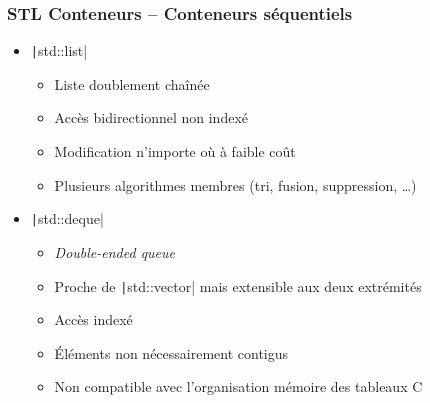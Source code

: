 \documentclass[C++.tex]{subfiles}
\begin{document}
\begin{frame}[fragile]
	\frametitle{STL Conteneurs -- Conteneurs séquentiels}
	\begin{itemize}
		\item \texttt|std::list|
		\begin{itemize}
			\item Liste doublement chaînée
			\item Accès bidirectionnel non indexé
			\item Modification n'importe où à faible coût
			\item Plusieurs algorithmes membres (tri, fusion, suppression, \ldots{})

		\end{itemize}

		\item \texttt|std::deque|
		\begin{itemize}
			\item \textit{Double-ended queue}
			\item Proche de \texttt|std::vector| mais extensible aux deux extrémités
			\item Accès indexé
			\item Éléments non nécessairement contigus
			\item Non compatible avec l'organisation mémoire des tableaux C
		\end{itemize}
	\end{itemize}
\end{frame}
\end{document}

